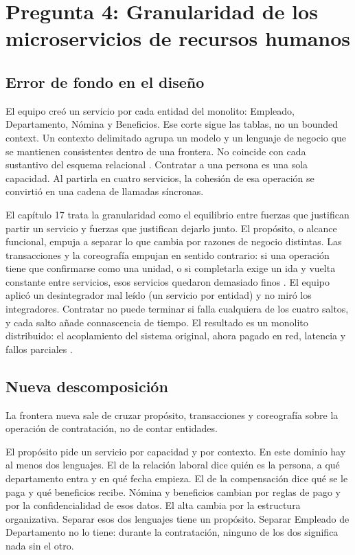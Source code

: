 \section{Pregunta 4: Granularidad de los microservicios de recursos humanos}

\subsection{Error de fondo en el diseño}
El equipo creó un servicio por cada entidad del monolito: Empleado, Departamento, Nómina y Beneficios. Ese corte sigue las tablas, no un bounded context. Un contexto delimitado agrupa un modelo y un lenguaje de negocio que se mantienen consistentes dentro de una frontera. No coincide con cada sustantivo del esquema relacional \parencite{richards2020fundamentals}. Contratar a una persona es una sola capacidad. Al partirla en cuatro servicios, la cohesión de esa operación se convirtió en una cadena de llamadas síncronas.

El capítulo 17 trata la granularidad como el equilibrio entre fuerzas que justifican partir un servicio y fuerzas que justifican dejarlo junto. El propósito, o alcance funcional, empuja a separar lo que cambia por razones de negocio distintas. Las transacciones y la coreografía empujan en sentido contrario: si una operación tiene que confirmarse como una unidad, o si completarla exige un ida y vuelta constante entre servicios, esos servicios quedaron demasiado finos \parencite{richards2020fundamentals}. El equipo aplicó un desintegrador mal leído (un servicio por entidad) y no miró los integradores. Contratar no puede terminar si falla cualquiera de los cuatro saltos, y cada salto añade connascencia de tiempo. El resultado es un monolito distribuido: el acoplamiento del sistema original, ahora pagado en red, latencia y fallos parciales \parencite{ford2021hard}.

\subsection{Nueva descomposición}
La frontera nueva sale de cruzar propósito, transacciones y coreografía sobre la operación de contratación, no de contar entidades.

El propósito pide un servicio por capacidad y por contexto. En este dominio hay al menos dos lenguajes. El de la relación laboral dice quién es la persona, a qué departamento entra y en qué fecha empieza. El de la compensación dice qué se le paga y qué beneficios recibe. Nómina y beneficios cambian por reglas de pago y por la confidencialidad de esos datos. El alta cambia por la estructura organizativa. Separar esos dos lenguajes tiene un propósito. Separar Empleado de Departamento no lo tiene: durante la contratación, ninguno de los dos significa nada sin el otro.

